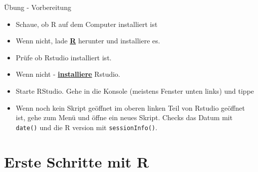\documentclass[ignorenonframetext,]{beamer}
\begin{document}
\begin{frame}[fragile]{Übung - Vorbereitung}
\protect\hypertarget{ubung---vorbereitung}{}

\begin{itemize}
\item
  Schaue, ob R auf dem Computer installiert ist
\item
  Wenn nicht, lade \href{r-project.org}{\textbf{R}} herunter und
  installiere es.
\item
  Prüfe ob Rstudio installiert ist.
\item
  Wenn nicht - \href{http://www.rstudio.com/}{\textbf{installiere}}
  Rstudio.
\item
  Starte RStudio. Gehe in die Konsole (meistens Fenster unten links) und
  tippe
\item
  Wenn noch kein Skript geöffnet im oberen linken Teil von Rstudio
  geöffnet ist, gehe zum Menü und öffne ein neues Skript. Checks das
  Datum mit \texttt{date()} und die R version mit
  \texttt{sessionInfo()}.
\end{itemize}

\end{frame}

\hypertarget{erste-schritte-mit-r}{%
\section{Erste Schritte mit R}\label{erste-schritte-mit-r}}
\end{document}
